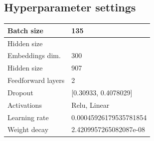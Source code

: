 \subsection{Hyperparameter settings}\label{s:params}

\begin{table}[]
\begin{tabular}{@{}ll@{}}
\toprule
Batch size         & 135                      \\ \midrule
Hidden size        &                          \\
Embeddings dim.    & 300                      \\
Hidden size        & 907                      \\
Feedforward layers & 2                        \\
Dropout            & {[}0.30933, 0.4078029{]} \\
Activations        & Relu, Linear             \\
Learning rate      & 0.00045926179535781854   \\
Weight decay       & 2.4209957265082087e-08   \\ \bottomrule
\end{tabular}
\end{table}